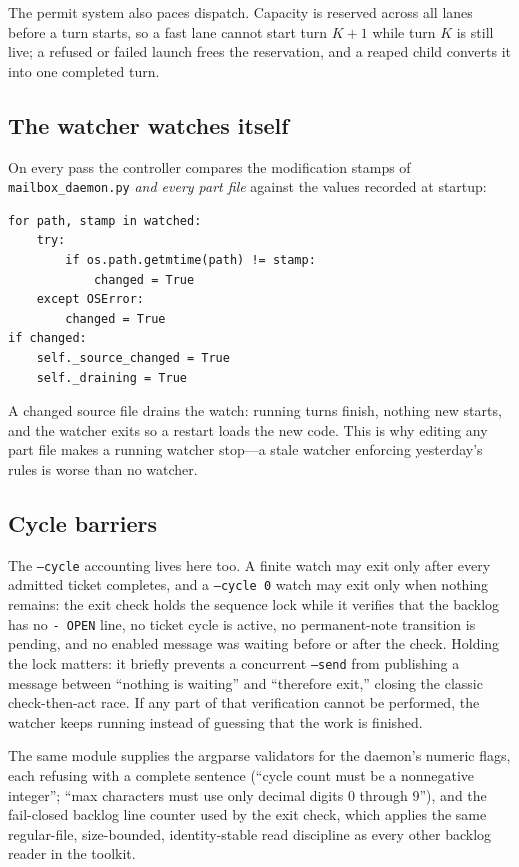 \documentclass[10pt,aps,prd,twocolumn,nofootinbib]{revtex4-2}
\newcommand{\code}[1]{\texttt{#1}}
\newcommand{\file}[1]{\texttt{#1}}
\begin{document}
The permit system also paces dispatch.  Capacity is reserved across
all lanes before a turn starts, so a fast lane cannot start turn
$K{+}1$ while turn $K$ is still live; a refused or failed launch frees
the reservation, and a reaped child converts it into one completed
turn.

\subsection{The watcher watches itself}

On every pass the controller compares the modification stamps of
\file{mailbox\_daemon.py} \emph{and every part file} against the
values recorded at startup:

\begin{verbatim}
for path, stamp in watched:
    try:
        if os.path.getmtime(path) != stamp:
            changed = True
    except OSError:
        changed = True
if changed:
    self._source_changed = True
    self._draining = True
\end{verbatim}

A changed source file drains the watch: running turns finish, nothing
new starts, and the watcher exits so a restart loads the new code.
This is why editing any part file makes a running watcher stop---a
stale watcher enforcing yesterday's rules is worse than no watcher.

\subsection{Cycle barriers}

The \code{--cycle} accounting lives here too.  A finite watch may
exit only after every admitted ticket completes, and a
\code{--cycle 0} watch may exit only when nothing remains: the exit
check holds the sequence lock while it verifies that the backlog has
no \code{- OPEN} line, no ticket cycle is active, no permanent-note
transition is pending, and no enabled message was waiting before or
after the check.  Holding the lock matters: it briefly prevents a
concurrent \code{--send} from publishing a message between ``nothing
is waiting'' and ``therefore exit,'' closing the classic
check-then-act race.  If any part of that verification cannot be
performed, the watcher keeps running instead of guessing that the work
is finished.

The same module supplies the argparse validators for the daemon's
numeric flags, each refusing with a complete sentence
(``cycle count must be a nonnegative integer''; ``max characters must
use only decimal digits 0 through 9''), and the fail-closed backlog
line counter used by the exit check, which applies the same
regular-file, size-bounded, identity-stable read discipline as every
other backlog reader in the toolkit.
\end{document}
